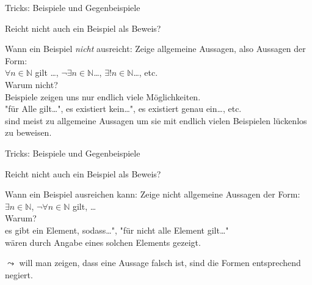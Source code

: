 \begin{frame}[fragile]{Tricks: Beispiele und Gegenbeispiele}
    \begin{alertblock}{Reicht nicht auch ein Beispiel als Beweis?}
    \end{alertblock}
    \begin{block}{Wann ein Beispiel \emph{nicht} ausreicht:}
        Zeige allgemeine Aussagen, also Aussagen der Form:\\$\forall n\in\mathbb{N}$ gilt \dots, $\neg\exists n\in\mathbb{N}$\dots, $\exists!n\in\mathbb{N}$\dots, etc.\\
        \alert{Warum nicht?}\\
        Beispiele zeigen uns nur endlich viele Möglichkeiten.\\
        "für Alle gilt\dots", \dq es existiert kein\dots", es existiert genau ein\dots, etc. \\sind meist zu allgemeine Aussagen um sie mit endlich vielen Beispielen lückenlos zu beweisen.
    \end{block}
\end{frame}

\begin{frame}[fragile]{Tricks: Beispiele und Gegenbeispiele}
    \begin{alertblock}{Reicht nicht auch ein Beispiel als Beweis?}
    \end{alertblock}
    \begin{block}{Wann ein Beispiel ausreichen kann:}
        Zeige nicht allgemeine Aussagen der Form:\\
        $\exists n\in\mathbb{N}$, $\neg\forall n\in\mathbb{N}$ gilt, \dots\\
        \alert{Warum?}\\
        \dq es gibt ein Element, sodass\dots", "für nicht alle Element gilt\dots"\\wären durch Angabe eines solchen Elements gezeigt.
    \end{block}
        $\leadsto$ will man zeigen, dass eine Aussage falsch ist, sind die Formen entsprechend negiert.
\end{frame}


